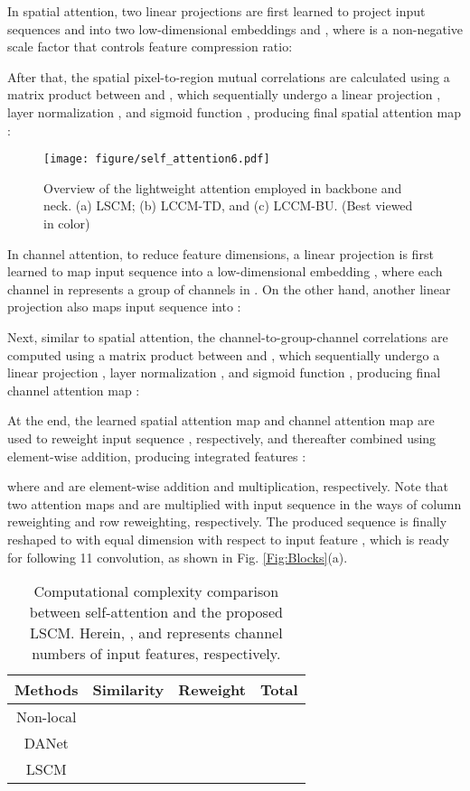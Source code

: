 \documentclass[lettersize,journal]{IEEEtran}
\begin{document}
In spatial attention, two linear projections  are first learned to project input sequences  and  into two low-dimensional embeddings  and , where  is a non-negative scale factor that controls feature compression ratio:



\noindent After that, the spatial pixel-to-region mutual correlations are calculated using a matrix product between  and , which sequentially undergo a linear projection , layer normalization , and sigmoid function , producing final spatial attention map :


\begin{figure*}[t!] 
\centering 
\texttt{[image: figure/self\_attention6.pdf]} 
\caption{Overview of the lightweight attention employed in backbone and neck. (a) LSCM; (b) LCCM-TD, and (c) LCCM-BU. (Best viewed in color)} 
\label{Fig:LSCM} 
\end{figure*}


In channel attention, to reduce feature dimensions, a linear projection  is first learned to map input sequence  into a low-dimensional embedding , where each channel in  represents a group of  channels in . On the other hand, another linear projection  also maps input sequence  into  :


Next, similar to spatial attention, the channel-to-group-channel correlations are computed using a matrix product between  and , which sequentially undergo a linear projection  , layer normalization , and sigmoid function , producing final channel attention map :


At the end, the learned spatial attention map  and channel attention map  are used to reweight input sequence , respectively, and thereafter combined using element-wise addition, producing integrated features :


where  and  are element-wise addition and multiplication, respectively. Note that two attention maps  and  are multiplied with input sequence  in the ways of column reweighting and row reweighting, respectively. The produced sequence  is finally reshaped to  with equal dimension with respect to input feature , which is ready for following 11 convolution, as shown in Fig. \ref{Fig:Blocks}(a).



\begin{table}
\tabcolsep 0.1mm\caption{Computational complexity comparison between self-attention and the proposed LSCM. Herein, , and  represents channel numbers of input features, respectively.}
	\begin{center}
	\begin{tabular}{c|c|c|c}
		\toprule \multirow{1}{*}{Methods} & \multirow{1}{*}{Similarity} & \multirow{1}{*}{Reweight} & \multirow{1}{*}{Total}\\
\midrule
		Non-local \cite{wang2018non} &  & &\\
		DANet \cite{fu2019dual} &  &  &\\
\midrule
LSCM &  &  &\\
\bottomrule
	\end{tabular}\label{tab:complex}
	\end{center}
\end{table}
\end{document}
